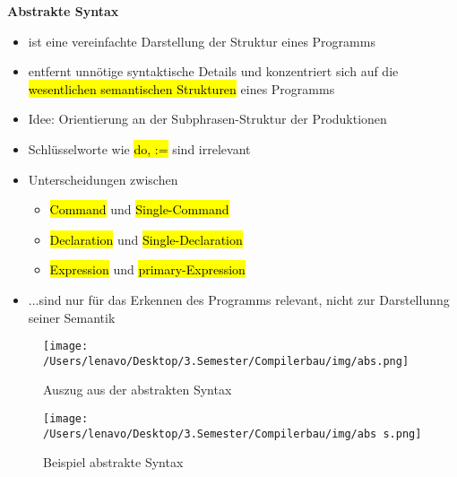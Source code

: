 \documentclass[a4paper, 10pt]{article}
\begin{document}
\noindent\textbf{Abstrakte Syntax}
\begin{itemize}
    \item ist eine vereinfachte Darstellung der Struktur eines Programms
    \item entfernt unnötige syntaktische Details und konzentriert sich auf die \hl{wesentlichen semantischen Strukturen} eines Programms
    \item Idee: Orientierung an der Subphrasen-Struktur der Produktionen
    \item Schlüsselworte wie \hl{do, :=} sind irrelevant
    \item Unterscheidungen zwischen
    \begin{itemize}
        \item \hl{Command} und \hl{Single-Command}
        \item \hl{Declaration} und \hl{Single-Declaration}
        \item \hl{Expression} und \hl{primary-Expression}
    \end{itemize}
    \item ...sind nur für das Erkennen des Programms relevant, nicht zur Darstellunng seiner Semantik
\end{itemize}
\begin{figure}[h]
    \centering
    \texttt{[image: /Users/lenavo/Desktop/3.Semester/Compilerbau/img/abs.png]}
    \caption{Auszug aus der abstrakten Syntax}
    \label{fig:enter-label}
\end{figure}

\begin{figure}[h]
    \centering
    \texttt{[image: /Users/lenavo/Desktop/3.Semester/Compilerbau/img/abs s.png]}
    \caption{Beispiel abstrakte Syntax}
    \label{fig:enter-label}
\end{figure}
\end{document}

